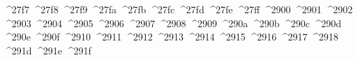 {  ^^^^27f7%
  ^^^^27f8%
  ^^^^27f9%
  ^^^^27fa%
  ^^^^27fb%
  ^^^^27fc%
  ^^^^27fd%
  ^^^^27fe%
  ^^^^27ff%
  ^^^^2900%
  ^^^^2901%
  ^^^^2902%
  ^^^^2903%
  ^^^^2904%
  ^^^^2905%
  ^^^^2906%
  ^^^^2907%
  ^^^^2908%
  ^^^^2909%
  ^^^^290a%
  ^^^^290b%
  ^^^^290c%
  ^^^^290d%
  ^^^^290e%
  ^^^^290f%
  ^^^^2910%
  ^^^^2911%
  ^^^^2912%
  ^^^^2913%
  ^^^^2914%
  ^^^^2915%
  ^^^^2916%
  ^^^^2917%
  ^^^^2918%
  ^^^^291d%
  ^^^^291e%
  ^^^^291f%
}
